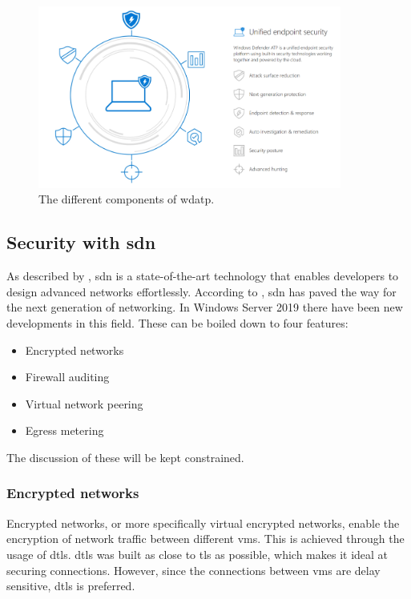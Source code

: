 \begin{figure}[hbt!]
	\centering
	\includegraphics[width=\textwidth,height=6cm,keepaspectratio=true]{img/StandVanZaken/WDATP.png}
	\caption[Components of \acrshort{wdatp}]{The different components of \acrlong{wdatp}. \autocite{Aslaner2018}}
	\label{fig:WDATPT2018}
\end{figure}

\subsection{Security with \acrshort{sdn}}
\label{encrypted-networks}
\label{sdn}
As described by \textcite{Shin2016}, \acrshort{sdn} is a state-of-the-art technology that enables developers to design advanced networks effortlessly. 
According to \textcite{Kreutz2015}, \acrshort{sdn} has paved the way for the next generation of networking. 
In Windows Server 2019 there have been new developments in this field. 
These can be boiled down to four features: 

\begin{itemize}
	\item Encrypted networks
	\item Firewall auditing
	\item Virtual network peering
	\item Egress metering
\end{itemize} 

The discussion of these will be kept constrained.

\subsubsection{Encrypted networks}
Encrypted networks, or more specifically virtual encrypted networks, enable the encryption of network traffic between different \acrshort{vm}s. 
This is achieved through the usage of \acrfull{dtls}. 
\acrshort{dtls} was built as close to \acrfull{tls} as possible, which makes it ideal at securing connections. 
However, since the connections between \acrshort{vm}s are delay sensitive, \acrshort{dtls} is preferred. \autocite{Modadugu2004}


